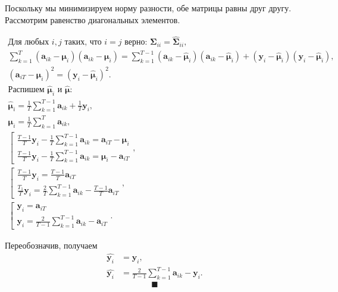 \documentclass{article}
\begin{document}
Поскольку мы минимизируем норму разности, обе матрицы равны друг другу. Рассмотрим равенство диагональных элементов.

\begin{gather*}
	\text{Для любых } i, j \text{ таких, что } i = j \text{ верно: } \mathbf{\Sigma}_{ii} = \hat{\mathbf{\Sigma}}_{ii},\\
	\sum_{k=1}^{T}(\mathbf{a}_{ik} - \boldsymbol{\mu}_i)(\mathbf{a}_{ik}-\boldsymbol{\mu}_i) = \sum_{k=1}^{T-1}(\mathbf{a}_{ik} - \hat{\boldsymbol{\mu}}_i)(\mathbf{a}_{ik}-\hat{\boldsymbol{\mu}}_i) + (\mathbf{y}_i - \hat{\boldsymbol{\mu}}_i)(\mathbf{y}_i - \hat{\boldsymbol{\mu}}_i),\\
	(\mathbf{a}_{iT}-\boldsymbol{\mu}_i)^2 = (\mathbf{y}_i-\hat{\boldsymbol{\mu}}_i)^2.\\
	\text{Распишем } \hat{\boldsymbol{\mu}}_i \text{ и } \hat{\boldsymbol{\mu}}:\\
	\hat{\boldsymbol{\mu}}_i = \frac{1}{T}\sum_{k=1}^{T-1}\mathbf{a}_{ik} + \frac{1}{T}\mathbf{y}_i,\\
	\boldsymbol{\mu}_i = \frac{1}{T}\sum_{k=1}^{T}\mathbf{a}_{ik},\\
	\left[
	\begin{array}{ll}
		\frac{T-1}{T}\mathbf{y}_i-\frac{1}{T}\sum_{k=1}^{T-1}\mathbf{a}_{ik}=\mathbf{a}_{iT}-\boldsymbol{\mu}_i
		\\[1ex]
		\frac{T-1}{T}\mathbf{y}_i-\frac{1}{T}\sum_{k=1}^{T-1}\mathbf{a}_{ik}=\boldsymbol{\mu}_i-\mathbf{a}_{iT}
	\end{array},
	\right .\\[1ex]
	\left[
	\begin{array}{ll}
		\frac{T-1}{T}\mathbf{y}_i = \frac{T-1}{T}\mathbf{a}_{iT}
		\\[1ex]
		\frac{T_1}{T}\mathbf{y}_i = \frac{2}{T} \sum_{k=1}^{T-1} \mathbf{a}_{ik} - \frac{T-1}{T}\mathbf{a}_{iT}
	\end{array},
	\right .\\[1ex]
	\left[
	\begin{array}{ll}
		\mathbf{y}_i = \mathbf{a}_{iT}
		\\[1ex]
		\mathbf{y}_i = \frac{2}{T-1} \sum_{k=1}^{T-1} \mathbf{a}_{ik} - \mathbf{a}_{iT}
	\end{array}.
	\right .
\end{gather*}

Переобозначив, получаем
\begin{align*}
	\hat{\mathbf{y}_i} &= \mathbf{y}_i,\\
	\hat{\mathbf{y}_i} &= \frac{2}{T-1} \sum_{k=1}^{T-1} \mathbf{a}_{ik} - \mathbf{y}_i.
\end{align*}
$$ \blacksquare $$
\end{document}
